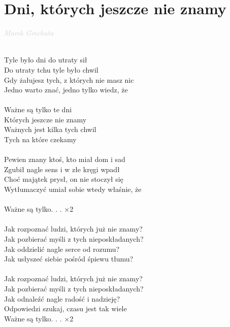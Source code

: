 \documentclass[a5paper, 10pt]{book}
\begin{document}
\section{Dni, których jeszcze nie znamy}\textcolor{lightgray}{\textit{Marek Grechuta}}\\~\\
\begin{minipage}[t]{0.7\textwidth}
Tyle było dni do utraty sił\\
Do utraty tchu tyle było chwil\\
Gdy żałujesz tych, z których nie masz nic\\
Jedno warto znać, jedno tylko wiedz, że\\
\\
\hspace*{5mm}Ważne są tylko te dni\\
\hspace*{5mm}Których jeszcze nie znamy\\
\hspace*{5mm}Ważnych jest kilka tych chwil\\
\hspace*{5mm}Tych na które czekamy\\
\\
Pewien znany ktoś, kto miał dom i sad\\
Zgubił nagle sens i w złe kręgi wpadł\\
Choć majątek prysł, on nie stoczył się\\
Wytłumaczyć umiał sobie wtedy właśnie, że\\
\\
\hspace*{5mm}Ważne są tylko. . . $\times $2\\
\\
Jak rozpoznać ludzi, których już nie znamy?\\
Jak pozbierać myśli z tych nieposkładanych?\\
Jak oddzielić nagle serce od rozumu?\\
Jak usłyszeć siebie pośród śpiewu tłumu?\\
\\
Jak rozpoznać ludzi, których już nie znamy?\\
Jak pozbierać myśli z tych nieposkładanych?\\
Jak odnaleźć nagle radość i nadzieję?\\
Odpowiedzi szukaj, czasu jest tak wiele\\

\hspace*{5mm}Ważne są tylko. . . $\times $2\\
\end{minipage}
\end{document}
